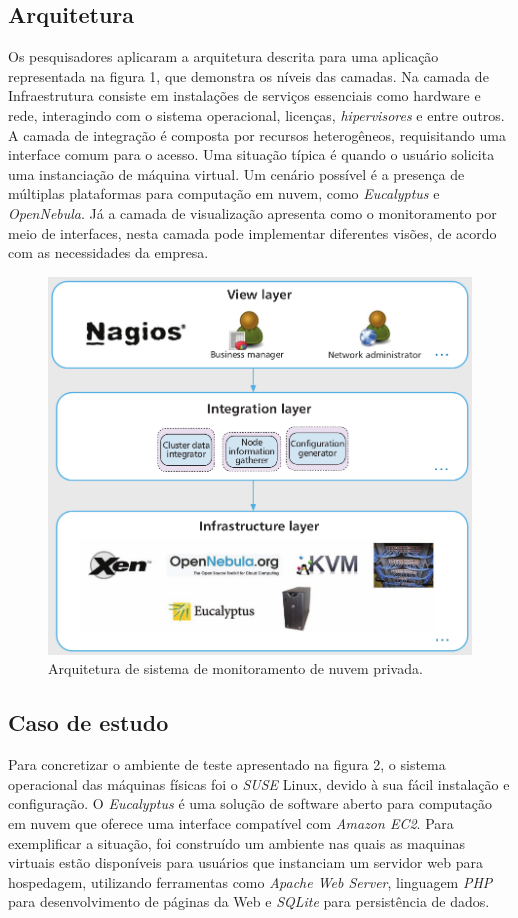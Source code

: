 \documentclass[12pt]{article}
\begin{document}
\subsection{Arquitetura}
Os pesquisadores aplicaram a arquitetura descrita para uma aplicação representada na figura 1, que demonstra os níveis das camadas. Na camada de Infraestrutura consiste em instalações de serviços essenciais como hardware e rede, interagindo com o sistema operacional, licenças, \emph{hipervisores} e entre outros. A camada de integração é composta por recursos heterogêneos, requisitando uma interface comum para o acesso. Uma situação típica é quando o usuário solicita uma instanciação de máquina virtual. Um cenário possível é a presença de múltiplas plataformas para computação em nuvem, como \emph{Eucalyptus} e \emph{OpenNebula}. Já a camada de visualização apresenta como o monitoramento por meio de interfaces, nesta camada pode implementar diferentes visões, de acordo com as necessidades da empresa.

\begin{figure}[H]
    \includegraphics[width=\linewidth]{arquitetura.png}
    \caption{Arquitetura de sistema de monitoramento de nuvem privada.}
\end{figure}

\subsection{Caso de estudo}
Para concretizar o ambiente de teste apresentado na figura 2, o sistema operacional das máquinas físicas foi o \emph{SUSE} Linux, devido à sua fácil instalação e configuração. O \emph{Eucalyptus} é uma solução de software aberto para computação em nuvem que oferece uma interface compatível com \emph{Amazon EC2}. Para exemplificar a situação, foi construído um ambiente nas quais as maquinas virtuais estão disponíveis para usuários que instanciam um servidor web para hospedagem, utilizando ferramentas como \emph{Apache Web Server}, linguagem \emph{PHP} para desenvolvimento de páginas da Web e \emph{SQLite} para persistência de dados.
\end{document}

